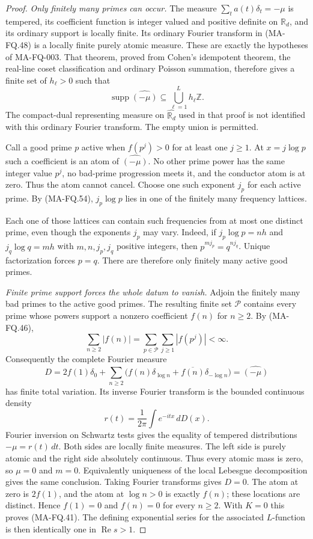\begin{proof}
\emph{Only finitely many primes can occur.}
The measure $\sum_t a(t)\delta_t=-\mu$ is tempered,
its coefficient function is integer valued and
positive definite on $\mathbb R_d$, and its
ordinary support is locally finite. Its ordinary
Fourier transform in (MA-FQ.48) is a locally finite
purely atomic measure. These are exactly the
hypotheses of MA-FQ-003. That theorem, proved from
Cohen's idempotent theorem, the real-line coset
classification and ordinary Poisson summation,
therefore gives a finite set of $h_\ell>0$ such that
\[
 \operatorname{supp}\widehat{(-\mu)}
                    \subseteq\bigcup_{\ell=1}^L h_\ell\mathbb Z.
 \tag{MA-FQ.54}
\]
The compact-dual representing measure on
$\widehat{\mathbb R_d}$ used in that proof is not
identified with this ordinary Fourier transform.
The empty union is permitted.

Call a good prime $p$ active when $f(p^j)>0$ for
at least one $j\ge1$. At $x=j\log p$ such a
coefficient is an atom of $\widehat{(-\mu)}$.
No other prime power has the same integer value
$p^j$, no bad-prime progression meets it, and the
conductor atom is at zero. Thus the atom cannot
cancel. Choose one such exponent $j_p$ for each
active prime. By (MA-FQ.54), $j_p\log p$ lies in
one of the finitely many frequency lattices.

Each one of those lattices can contain such
frequencies from at most one distinct prime,
even though the exponents $j_p$ may vary.
Indeed, if
$j_p\log p=nh$ and $j_q\log q=mh$ with
$m,n,j_p,j_q$ positive integers, then
$p^{mj_p}=q^{nj_q}$. Unique factorization forces
$p=q$. There are therefore only finitely many
active good primes.

\emph{Finite prime support forces the whole datum to vanish.}
Adjoin the finitely many bad primes to the active good
primes. The resulting finite set $\mathcal P$ contains
every prime whose powers support a nonzero coefficient
$f(n)$ for $n\ge2$. By (MA-FQ.46),
\[
                \sum_{n\ge2}|f(n)|
                =\sum_{p\in\mathcal P}\sum_{j\ge1}|f(p^j)|
                <\infty.
 \tag{MA-FQ.55}
\]
Consequently the complete Fourier measure
\[
 D=2f(1)\delta_0+
       \sum_{n\ge2}\bigl(f(n)\delta_{\log n}
                    +\overline{f(n)}\delta_{-\log n}\bigr)
          =\widehat{(-\mu)}
 \tag{MA-FQ.56}
\]
has finite total variation. Its inverse Fourier
transform is the bounded continuous density
\[
               r(t)=\frac1{2\pi}\int e^{-itx}\,dD(x).
 \tag{MA-FQ.57}
\]
Fourier inversion on Schwartz tests gives the
equality of tempered distributions $-\mu=r(t)\,dt$.
Both sides are locally finite measures.
The left side is purely atomic and the right
side absolutely continuous. Thus every atomic
mass is zero, so $\mu=0$ and $m=0$.
Equivalently uniqueness of the local Lebesgue
decomposition gives the same conclusion.
Taking Fourier transforms gives $D=0$.
The atom at zero is $2f(1)$, and the atom at
$\log n>0$ is exactly $f(n)$; these locations
are distinct. Hence $f(1)=0$ and $f(n)=0$
for every $n\ge2$. With $K=0$ this proves
(MA-FQ.41). The defining exponential series for
the associated $L$-function is then identically
one in $\operatorname{Re}s>1$.
\end{proof}

